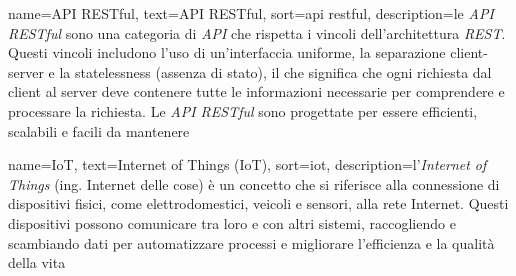  {
    name=API RESTful,
    text=API RESTful,
    sort=api restful,
    description={le \emph{API RESTful} sono una categoria di \emph{API} che rispetta i vincoli dell'architettura \emph{REST}. Questi vincoli includono l'uso di un'interfaccia uniforme, la separazione client-server e la statelessness (assenza di stato), il che significa che ogni richiesta dal client al server deve contenere tutte le informazioni necessarie per comprendere e processare la richiesta. Le \emph{API RESTful} sono progettate per essere efficienti, scalabili e facili da mantenere}
}

 {
    name=IoT,
    text=Internet of Things (IoT),
    sort=iot,
    description={l'\emph{Internet of Things} (ing. Internet delle cose) è un concetto che si riferisce alla connessione di dispositivi fisici, come elettrodomestici, veicoli e sensori, alla rete Internet. Questi dispositivi possono comunicare tra loro e con altri sistemi, raccogliendo e scambiando dati per automatizzare processi e migliorare l'efficienza e la qualità della vita}
}